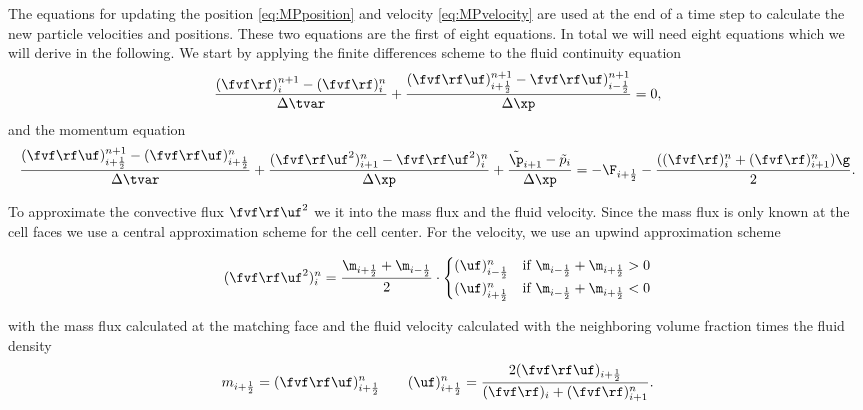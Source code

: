 The equations for updating the position \eqref{eq:MPposition} and velocity \eqref{eq:MPvelocity} are used at the end of a time step to calculate the new particle velocities and positions.
These two equations are the first of eight equations.
In total we will need eight equations which we will derive in the following.
We start by applying the finite differences scheme to the fluid continuity equation
\begin{equation}
    \label{eq:gasContDisc}
    \dfrac{(\fvf \rf)_i^{n+1} - (\fvf \rf)_i^n}{\Delta \tvar} + \dfrac{(\fvf \rf \uf)_{i+\frac{1}{2}}^{n+1}- \fvf \rf \uf)_{i-\frac{1}{2}}^{n+1}}{\Delta \xp} = 0,
\end{equation}
and the momentum equation
\begin{equation}
    \label{eq:discMom}
    \dfrac{(\fvf \rf \uf)_{i+\frac{1}{2}}^{n+1}- (\fvf \rf \uf)_{i+\frac{1}{2}}^{n}}{\Delta \tvar} + \dfrac{(\fvf \rf \uf^2)^n_{i+1}-\fvf \rf \uf^2)^n_{i}}{\Delta \xp} + \dfrac{\tilde{\p}_{i+1}-\tilde{p}_i}{\Delta \xp} = - \F_{i+\frac{1}{2}}-\dfrac{((\fvf \rf)_i^n + (\fvf \rf)_{i+1}^n)\g}{2}.
\end{equation}


To approximate the convective flux $\fvf \rf \uf^2$ we it into the mass flux and the fluid velocity.
Since the mass flux is only known at the cell faces we use a central approximation scheme for the cell center. 
For the velocity, we use an upwind approximation scheme

\begin{align*}
    (\fvf \rf \uf^2)_i^n = \dfrac{\m_{i+\frac{1}{2}}+\m_{i-\frac{1}{2}}}{2} \cdot
    \begin{cases}
        (\uf)^n_{i- \frac{1}{2}} & \text{if } \m_{i-\frac{1}{2}} + \m_{i+\frac{1}{2}} > 0 \\
        (\uf)^n_{i+ \frac{1}{2}} & \text{if } \m_{i-\frac{1}{2}} + \m_{i+\frac{1}{2}} < 0
    \end{cases}
\end{align*}

with the mass flux calculated at the matching face and the fluid velocity calculated with the neighboring volume fraction times the fluid density
\begin{align*}
    m_{i+\frac{1}{2}} = (\fvf \rf \uf)^n_{i+\frac{1}{2}} \qquad (\uf)_{i+\frac{1}{2}}^n = \dfrac{2 (\fvf \rf \uf)_{i+\frac{1}{2}}}{(\fvf \rf)_{i} + (\fvf \rf)_{i+1}^n}.
\end{align*}


